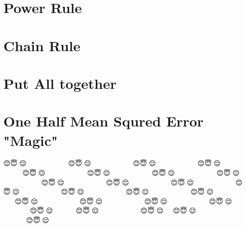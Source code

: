 \documentclass[11pt]{article}
\begin{document}
    \section{Power Rule}\label{power-rule}

    \section{Chain Rule}\label{chain-rule}

    \section{Put All together}\label{put-all-together}

    \section{One Half Mean Squred Error
"Magic"}\label{one-half-mean-squred-error-magic}

    😊😇🙂😌🤓🤓🙌🏿👏🏿👏🏿👏🏿👏🏿👏🏿👏🏿👏🏿👏🏿👏🏿😊😇🙂😌🤓🤓🙌🏿👏🏿👏🏿👏🏿👏🏿👏🏿👏🏿👏🏿👏🏿👏🏿😊😇🙂😌🤓🤓🙌🏿👏🏿👏🏿👏🏿👏🏿👏🏿👏🏿👏🏿👏🏿👏🏿😊😇🙂😌🤓🤓🙌🏿👏🏿👏🏿👏🏿👏🏿👏🏿👏🏿👏🏿👏🏿👏🏿😊😇🙂😌🤓🤓🙌🏿👏🏿👏🏿👏🏿👏🏿👏🏿👏🏿👏🏿👏🏿👏🏿😊😇🙂😌🤓🤓🙌🏿👏🏿👏🏿👏🏿👏🏿👏🏿👏🏿👏🏿👏🏿👏🏿😊😇🙂😌🤓🤓🙌🏿👏🏿👏🏿👏🏿👏🏿👏🏿👏🏿👏🏿👏🏿👏🏿😊😇🙂😌🤓🤓🙌🏿👏🏿👏🏿👏🏿👏🏿👏🏿👏🏿👏🏿👏🏿👏🏿😊😇🙂😌🤓🤓🙌🏿👏🏿👏🏿👏🏿👏🏿👏🏿👏🏿👏🏿👏🏿👏🏿😊😇🙂😌🤓🤓🙌🏿👏🏿👏🏿👏🏿👏🏿👏🏿👏🏿👏🏿👏🏿👏🏿😊😇🙂😌🤓🤓🙌🏿👏🏿👏🏿👏🏿👏🏿👏🏿👏🏿👏🏿👏🏿👏🏿😊😇🙂😌🤓🤓🙌🏿👏🏿👏🏿👏🏿👏🏿👏🏿👏🏿👏🏿👏🏿👏🏿😊😇🙂😌🤓🤓🙌🏿👏🏿👏🏿👏🏿👏🏿👏🏿👏🏿👏🏿👏🏿👏🏿😊😇🙂😌🤓🤓🙌🏿👏🏿👏🏿👏🏿👏🏿👏🏿👏🏿👏🏿👏🏿👏🏿😊😇🙂😌🤓🤓🙌🏿👏🏿👏🏿👏🏿👏🏿👏🏿👏🏿👏🏿👏🏿👏🏿😊😇🙂😌🤓🤓🙌🏿👏🏿👏🏿👏🏿👏🏿👏🏿👏🏿👏🏿👏🏿👏🏿😊😇🙂😌🤓🤓🙌🏿👏🏿👏🏿👏🏿👏🏿👏🏿👏🏿👏🏿👏🏿👏🏿😊😇🙂😌🤓🤓🙌🏿👏🏿👏🏿👏🏿👏🏿👏🏿👏🏿👏🏿👏🏿👏🏿😊😇🙂😌🤓🤓🙌🏿👏🏿👏🏿👏🏿👏🏿👏🏿👏🏿👏🏿👏🏿😊😇🙂😌🤓🤓🙌🏿👏🏿👏🏿👏🏿👏🏿😊😇🙂😌🤓🤓🙌🏿👏🏿👏🏿👏🏿👏🏿👏🏿👏🏿👏🏿👏🏿👏🏿😊😇🙂😌🤓🤓🙌🏿👏😊😇🙂😌🤓🤓🙌🏿👏🏿👏🏿👏🏿👏🏿👏🏿👏🏿👏🏿👏🏿👏🏿👏🏿👏🏿👏🏿👏🏿👏🏿👏🏿👏🏿👏🏿😊😇🙂😌🤓🤓🙌🏿👏🏿👏🏿👏🏿👏🏿👏🏿👏🏿👏🏿👏🏿👏🏿👏🏿👏🏿👏🏿👏🏿👏🏿
\end{document}
